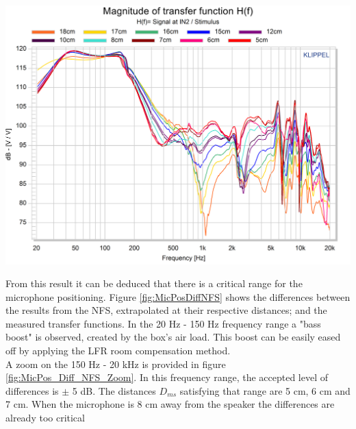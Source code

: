 \documentclass{report}
\begin{document}
\begin{minipage}{0.6\textwidth}
\begin{center}
	\includegraphics[width=1\textwidth]{RoomComp/MicPos_TRF} 
    \captionsetup{hypcap=false} 
	\label{fig:MicPosTRF}
\end{center}
\end{minipage}
\vspace{0.1cm}

From this result it can be deduced that there is a critical range for the microphone positioning. Figure \ref{fig:MicPosDiffNFS} shows the differences between the results from the NFS, extrapolated at their respective distances; and the measured transfer functions. In the 20 Hz - 150 Hz frequency range a "bass boost" is observed, created by the box's air load. This boost can be easily eased off by applying the LFR room compensation method.\\
A zoom on the 150 Hz - 20 kHz is provided in figure \ref{fig:MicPos_Diff_NFS_Zoom}. In this frequency range, the accepted level of differences is $\pm$ 5 dB. The distances $D_{ms}$ satisfying that range are 5 cm, 6 cm and 7 cm. When the microphone is 8 cm away from the speaker the differences are already too critical
\end{document}
